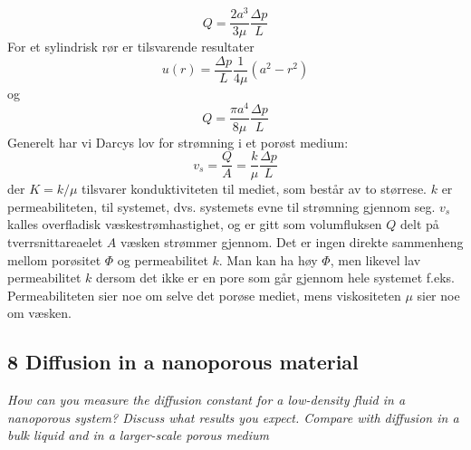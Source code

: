 \documentclass[english, a4paper]{article}
\begin{document}
\begin{equation}
 Q = \frac{2a^3}{3\mu} \frac{\Delta p}{L}
\end{equation}
For et sylindrisk rør er tilsvarende resultater
\begin{equation}
 u(r) = \frac{\Delta p}{L} \frac{1}{4\mu} (a^2 - r^2)
\end{equation}
og
\begin{equation}
 Q = \frac{\pi a^4}{8\mu} \frac{\Delta p}{L}
\end{equation}
Generelt har vi Darcys lov for strømning i et porøst medium:
\begin{equation}
 v_s = \frac{Q}{A} = \frac{k}{\mu}\frac{\Delta p}{L}
 \label{DarcysLaw}
\end{equation}
der $K = k/\mu$ tilsvarer konduktiviteten til mediet, som består av to størrese. $k$ er permeabiliteten, til systemet,
dvs. systemets evne til strømning gjennom seg. 
$v_s$ kalles overfladisk væskestrømhastighet, og er gitt som volumfluksen $Q$ delt på tverrsnittareaelet
$A$ væsken strømmer gjennom. 
Det er ingen direkte sammenheng mellom porøsitet $\Phi$ og permeabilitet $k$. Man kan ha høy $\Phi$, men likevel
lav permeabilitet $k$ dersom det ikke er en pore som går gjennom hele systemet f.eks. Permeabiliteten
sier noe om selve det porøse mediet, mens viskositeten $\mu$ sier noe om væsken. \\



\subsection{8 Diffusion in a nanoporous material}
\textit{How can you measure the diffusion constant for a low-density fluid in a nanoporous system?
Discuss what results you expect. Compare with diffusion in a bulk liquid and in a larger-scale porous
medium}\\
\end{document}
